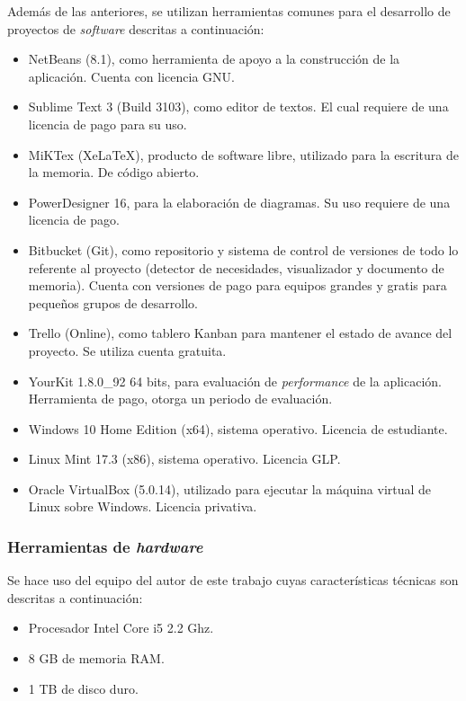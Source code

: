 Además de las anteriores, se utilizan herramientas comunes para el desarrollo de proyectos de \textit{software} descritas a continuación:

\begin{itemize}
\item NetBeans (8.1), como herramienta de apoyo a la construcción de la aplicación. Cuenta con licencia GNU.
\item Sublime Text 3 (Build 3103), como editor de textos. El cual requiere de una licencia de pago para su uso.
\item MiKTex (XeLaTeX), producto de software libre, utilizado para la escritura de la memoria. De código abierto.
\item PowerDesigner 16, para la elaboración de diagramas. Su uso requiere de una licencia de pago.
\item Bitbucket (Git), como repositorio y sistema de control de versiones de todo lo referente al proyecto (detector de necesidades, visualizador y documento de memoria). Cuenta con versiones de pago para equipos grandes y gratis para pequeños grupos de desarrollo.
\item Trello (Online), como tablero Kanban para mantener el estado de avance del proyecto. Se utiliza cuenta gratuita.
\item YourKit 1.8.0\_92 64 bits, para evaluación de \textit{performance} de la aplicación. Herramienta de pago, otorga un periodo de evaluación.
\item Windows 10 Home Edition (x64), sistema operativo. Licencia de estudiante.
\item Linux Mint 17.3 (x86), sistema operativo. Licencia GLP.
\item Oracle VirtualBox (5.0.14), utilizado para ejecutar la máquina virtual de Linux sobre Windows. Licencia privativa.
\end{itemize}

\subsubsection*{Herramientas de \textit{hardware}}
\label{subsubsec:HerrHardw}

Se hace uso del equipo del autor de este trabajo cuyas características técnicas son descritas a continuación:
\begin{itemize}
\item Procesador Intel Core i5 2.2 Ghz.
\item 8 GB de memoria RAM.
\item 1 TB de disco duro.
\end{itemize}

